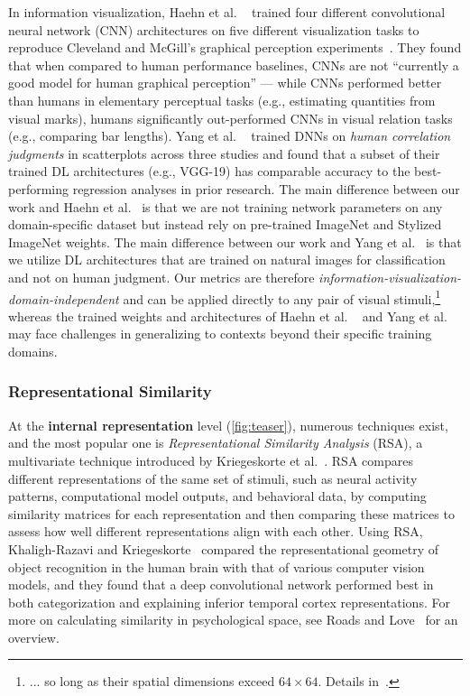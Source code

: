 \documentclass[sigconf]{acmart}
\begin{document}
In information visualization, Haehn et al. ~\cite{haehnEvaluatingGraphicalPerception2019} trained four different convolutional neural network (CNN) architectures on five different visualization tasks to reproduce Cleveland and McGill's graphical perception experiments~\cite{cleveland1984graphical}. They found that when compared to human performance baselines, CNNs are not ``currently a good model for human graphical perception'' --- while CNNs performed better than humans in elementary perceptual tasks (e.g., estimating quantities from visual marks), humans significantly out-performed CNNs in visual relation tasks (e.g., comparing bar lengths). Yang et al. ~\cite{yang2023can} trained DNNs on \textit{human correlation judgments} in scatterplots across three studies and found that a subset of their trained DL architectures (e.g., VGG-19) has comparable accuracy to the best-performing regression analyses in prior research. The main difference between our work and Haehn et al.~\cite{haehnEvaluatingGraphicalPerception2019} is that we are not training network parameters on any domain-specific dataset but instead rely on pre-trained ImageNet and Stylized ImageNet weights. The main difference between our work and Yang et al.~\cite{yang2023can} is that we utilize DL architectures that are trained on natural images for classification and not on human judgment. Our metrics are therefore \textit{information-visualization-domain-independent} and can be applied directly to any pair of visual stimuli,\footnote{... so long as their spatial dimensions exceed $64 \times 64$. Details in~.} whereas the trained weights and architectures of Haehn et al. ~\cite{haehnEvaluatingGraphicalPerception2019} and Yang et al. ~\cite{haehnEvaluatingGraphicalPerception2019} may face challenges in generalizing to contexts beyond their specific training domains.

\subsubsection{Representational Similarity}

At the \textbf{internal representation} level (\cref{fig:teaser}), numerous techniques exist, and the most popular one is \textit{Representational Similarity Analysis} (RSA), a multivariate technique introduced by Kriegeskorte et al.~\cite{kriegeskorte2008representational}. RSA compares different representations of the same set of stimuli, such as neural activity patterns, computational model outputs, and behavioral data, by computing similarity matrices for each representation and then comparing these matrices to assess how well different representations align with each other. Using RSA, Khaligh-Razavi and Kriegeskorte~\cite{khaligh2014deep} compared the representational geometry of object recognition in the human brain with that of various computer vision models, and they found that a deep convolutional network performed best in both categorization and explaining inferior temporal cortex representations. For more on calculating similarity in psychological space, see Roads and Love~\cite{roads2024modeling} for an overview. 
\end{document}
